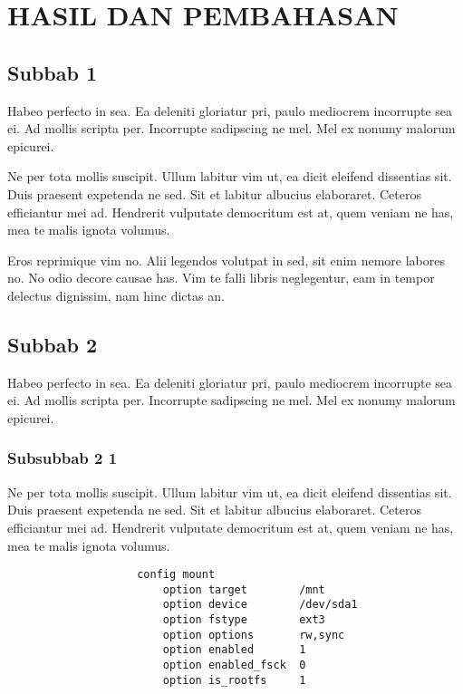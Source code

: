 
\chapter{HASIL DAN PEMBAHASAN}
	\section{Subbab 1}
		Habeo perfecto in sea. Ea deleniti gloriatur pri, paulo mediocrem incorrupte sea ei. Ad mollis scripta per. Incorrupte sadipscing ne mel. Mel ex nonumy malorum epicurei.

		Ne per tota mollis suscipit. Ullum labitur vim ut, ea dicit eleifend dissentias sit. Duis praesent expetenda ne sed. Sit et labitur albucius elaboraret. Ceteros efficiantur mei ad. Hendrerit vulputate democritum est at, quem veniam ne has, mea te malis ignota volumus.

		Eros reprimique vim no. Alii legendos volutpat in sed, sit enim nemore labores no. No odio decore causae has. Vim te falli libris neglegentur, eam in tempor delectus dignissim, nam hinc dictas an.
	
	\section{Subbab 2}		
		Habeo perfecto in sea. Ea deleniti gloriatur pri, paulo mediocrem incorrupte sea ei. Ad mollis scripta per. Incorrupte sadipscing ne mel. Mel ex nonumy malorum epicurei.

		\subsection{Subsubbab 2 1}
			Ne per tota mollis suscipit. Ullum labitur vim ut, ea dicit eleifend dissentias sit. Duis praesent expetenda ne sed. Sit et labitur albucius elaboraret. Ceteros efficiantur mei ad. Hendrerit vulputate democritum est at, quem veniam ne has, mea te malis ignota volumus.
			
			\begingroup
			    \fontsize{10pt}{12pt}\selectfont
			    \begin{verbatim}
					config mount
				        option target        /mnt
				        option device        /dev/sda1
				        option fstype        ext3
				        option options       rw,sync
				        option enabled       1
				        option enabled_fsck  0
				        option is_rootfs     1
			    \end{verbatim}  
			\endgroup

